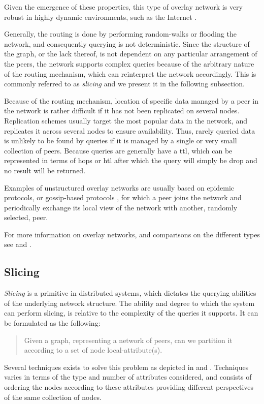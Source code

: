 \documentclass[12pt, titlepage]{uo_temp}
\begin{document}
     Given the emergence of these properties, this type of overlay network is very robust
     in highly dynamic environments, such as the Internet \cite{birman2007promise}. 
     
     Generally, the routing is done by performing random-walks or flooding the network,
     and consequently querying is not deterministic. Since the structure of the graph, or
     the lack thereof, is not dependent on any particular arrangement of the peers, the
     network supports complex queries because of the arbitrary nature of the routing
     mechanism, which can reinterpret the network accordingly. This is commonly referred
     to as \emph{slicing} and we present it in the following subsection.

     Because of the routing mechanism, location of specific data managed by a peer in
     the network is rather difficult if it has not been replicated on several
     nodes. Replication schemes usually target the most popular data in the network, and
     replicates it across several nodes to ensure availability. Thus, rarely queried data
     is unlikely to be found by queries if it is managed by a single or very small
     collection of peers. Because queries are generally have a \gls{ttl}, which
     can be represented in terms of hops or \gls{htl} after which the query will simply be
     drop and no result will be returned.

     Examples of unstructured overlay networks are usually based on epidemic protocols, or
     gossip-based protocols \cite{riviere2011gossip}, for which a peer joins the network
     and periodically exchange its local view of the network with another, randomly
     selected, peer. 
     
     For more information on overlay networks, and comparisons on the different types see
     \cite{lua2005survey} and \cite{p2p_collab}. 
     
     \subsection{Slicing}\label{bkg_slice} 

     \emph{Slicing} is a primitive in distributed systems, which dictates the querying
     abilities of the underlying network structure. The ability and degree
     to which the system can perform slicing, is relative to the complexity of the queries
     it supports. It can be formulated as the following:
     \begin{quote}
       Given a graph, representing a network of peers, can we partition it according to a
       set of node local-attribute(s).
     \end{quote}
     Several techniques exists to solve this problem as depicted in
     \cite{jelasity2006ordered} and \cite{pasquet2014autonomous}. Techniques varies in
     terms of the type and number of attributes considered, and consists of ordering the
     nodes according to these attributes providing different perspectives of the same
     collection of nodes.
\end{document}

